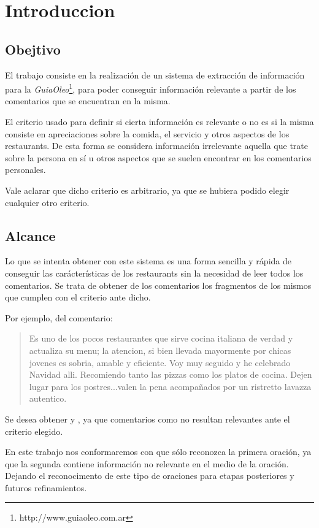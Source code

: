 \section{Introduccion}

\subsection{Obejtivo}

El trabajo consiste en la realización de un sistema de extracción de información para la \emph{GuiaOleo}\footnote{http://www.guiaoleo.com.ar}, para poder conseguir información relevante a partir de los comentarios que se encuentran en la misma.

El criterio usado para definir si cierta información es relevante o no es si la misma consiste en apreciaciones sobre la comida, el servicio y otros aspectos de los restaurants. De esta forma se considera información irrelevante aquella que trate sobre la persona en sí u otros aspectos  que se suelen encontrar en los comentarios personales.

Vale aclarar que dicho criterio es arbitrario, ya que se hubiera podido elegir cualquier otro criterio.

\subsection{Alcance}

Lo que se intenta obtener con este sistema es una forma sencilla y rápida de conseguir las carácterísticas de los restaurants sin la necesidad de leer todos los comentarios. Se trata de obtener de los comentarios los fragmentos de los mismos que cumplen con el criterio ante dicho.

Por ejemplo, del comentario:

\begin{quotation}
Es uno de los pocos restaurantes que sirve cocina italiana de verdad y actualiza su menu; la atencion, si bien llevada mayormente por chicas jovenes es sobria, amable y eficiente. Voy muy seguido y he celebrado Navidad alli. Recomiendo tanto las pizzas como los platos de cocina. Dejen lugar para los postres...valen la pena acompañados por un ristretto lavazza autentico.
\end{quotation}

Se desea obtener  y , ya que comentarios como  no resultan relevantes ante el criterio elegido.

En este trabajo nos conformaremos con que sólo reconozca la primera oración, ya que la segunda contiene información no relevante en el medio de la oración. Dejando el reconocimento de este tipo de oraciones para etapas posteriores y futuros refinamientos.